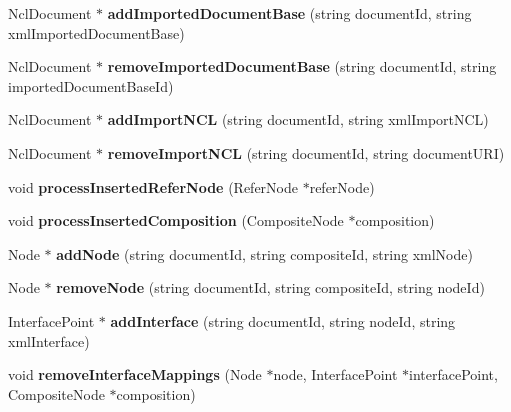 \begin{CompactItemize}
\item 
NclDocument $\ast$ \textbf{addImportedDocumentBase} (string documentId, string xmlImportedDocumentBase)\label{classbr_1_1pucrio_1_1telemidia_1_1ginga_1_1ncl_1_1FormatterMediator_67bc061d4662a6ea0cb0e7f04fca2b8e}

\item 
NclDocument $\ast$ \textbf{removeImportedDocumentBase} (string documentId, string importedDocumentBaseId)\label{classbr_1_1pucrio_1_1telemidia_1_1ginga_1_1ncl_1_1FormatterMediator_dcaca18dc569f437b7cf8cc08d9c1b75}

\item 
NclDocument $\ast$ \textbf{addImportNCL} (string documentId, string xmlImportNCL)\label{classbr_1_1pucrio_1_1telemidia_1_1ginga_1_1ncl_1_1FormatterMediator_f01972b80689e1e15035431c74cdc589}

\item 
NclDocument $\ast$ \textbf{removeImportNCL} (string documentId, string documentURI)\label{classbr_1_1pucrio_1_1telemidia_1_1ginga_1_1ncl_1_1FormatterMediator_ec83344e580ce947b94398ad67ffc445}

\item 
void \textbf{processInsertedReferNode} (ReferNode $\ast$referNode)\label{classbr_1_1pucrio_1_1telemidia_1_1ginga_1_1ncl_1_1FormatterMediator_e5ffde77f73ff3b0d56b170e91c5079b}

\item 
void \textbf{processInsertedComposition} (CompositeNode $\ast$composition)\label{classbr_1_1pucrio_1_1telemidia_1_1ginga_1_1ncl_1_1FormatterMediator_234bb303cf45910308068706d578a43b}

\item 
Node $\ast$ \textbf{addNode} (string documentId, string compositeId, string xmlNode)\label{classbr_1_1pucrio_1_1telemidia_1_1ginga_1_1ncl_1_1FormatterMediator_eeb7118e73f86f9e196d4335fd21e6db}

\item 
Node $\ast$ \textbf{removeNode} (string documentId, string compositeId, string nodeId)\label{classbr_1_1pucrio_1_1telemidia_1_1ginga_1_1ncl_1_1FormatterMediator_be5b17c80f64868f98404e048b493e40}

\item 
InterfacePoint $\ast$ \textbf{addInterface} (string documentId, string nodeId, string xmlInterface)\label{classbr_1_1pucrio_1_1telemidia_1_1ginga_1_1ncl_1_1FormatterMediator_9712c1fafd77b7c5ee0a29dac44c677d}

\item 
void \textbf{removeInterfaceMappings} (Node $\ast$node, InterfacePoint $\ast$interfacePoint, CompositeNode $\ast$composition)\label{classbr_1_1pucrio_1_1telemidia_1_1ginga_1_1ncl_1_1FormatterMediator_5cec90a30527fe413f2fd649b9c5912d}


\end{CompactItemize}
